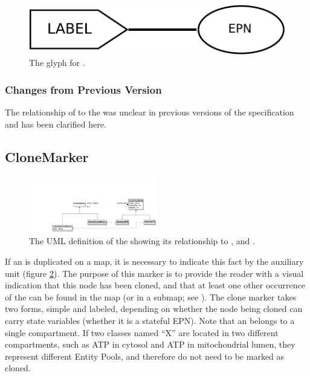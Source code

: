 \begin{figure}[H]
  \centering
  \includegraphics[scale = 0.4]{images/equivalence}
  \caption{The \PD glyph for .}
  \label{fig:equivalence}
\end{figure}

\subsubsection{Changes from Previous Version}

The relationship of  to the
 was unclear in previous versions of the
specification and has been clarified here.

\subsection{CloneMarker}
\label{defn:CloneMarker}
\label{sec:cloneMarker}

\begin{figure}[htb]
  \centering
  \includegraphics[width = 0.5\textwidth]{images/clonemarkeruml}
  \caption{The UML definition of the  showing
    its relationship to , 
    and .}
  \label{fig:clonemarkeruml}
\end{figure}

If an  is duplicated on a map, it is
necessary to indicate this fact by the 
auxiliary unit (figure \ref{fig:clonemarkeruml}).  The purpose of this
marker is to provide the reader with a visual indication that this
node has been cloned, and that at least one other occurrence of the
 can be found in the map (or in a submap;
see ).  The clone marker takes two forms, simple and
labeled, depending on whether the node being cloned can carry state
variables (\ie whether it is a stateful EPN). Note that an
 belongs to a single compartment. If two
classes named ``X'' are located in two different compartments, such as
ATP in cytosol and ATP in mitochondrial lumen, they represent
different Entity Pools, and therefore do not need to be marked as
cloned.

